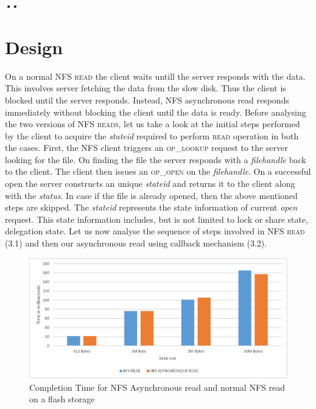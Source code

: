 \textit{\emph{•\emph{\textit{•}}}}\section{Design}

\label{Design}

On a normal \textsc{NFS read} the client waits untill the server responds with the data. This involves server fetching the data from the slow disk. Thus the client is blocked until the server responds. Instead, NFS asynchronous read responds immediately without blocking the client until the data is ready. Before analysing the two versions of \textsc{NFS reads}, let us take a look at the initial steps performed by the client to acquire the \textit{stateid} required to perform \textsc{read} operation in both the cases. First, the NFS client triggers an \textsc{op\_lookup} request to the server looking for the file. On finding the file the server responds with a \textit{filehandle} back to the client. The client then issues an \textsc{op\_open} on the \textit{filehandle}. On a successful open the server constructs an unique \textit{stateid} and returns it to the client along with the \textit{status}. In case if the file is already opened, then the above mentioned steps are skipped. The \textit{stateid} represents the state information of current \textit{open} request. This state information includes, but is not limited to lock or share state, delegation state. Let us now analyse the sequence of steps involved in \textsc{NFS read} (3.1) and then our asynchronous read using callback mechanism (3.2).

\begin{figure}
\centering
\includegraphics[scale=1.0]{figures/completion_time.eps}
\caption{Completion	Time for NFS Asynchronous read and normal NFS read on a flash storage}
\label{fig:NFSCompletionTimes}
\end{figure}  

